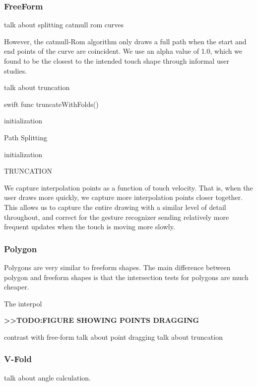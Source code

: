 \subsubsection{FreeForm}\label{freeform}

talk about splitting catmull rom curves

However, the catmull-Rom algorithm only draws a full path when the start
and end points of the curve are coincident. We use an alpha value of
1.0, which we found to be the closest to the intended touch shape
through informal user studies.

talk about truncation

\small
\singlespacing 

\begin{pygmented}{swift}
func truncateWithFolds()
\end{pygmented}

\doublespacing
\normalsize

\begin{algorithm}[H]
 initialization\;
 \caption{Path Splitting}
\end{algorithm}

\begin{algorithm}[H]
 initialization\;
 \caption{TRUNCATION}
\end{algorithm}

We capture interpolation points as a function of touch velocity. That
is, when the user draws more quickly, we capture more interpolation
points closer together. This allows us to capture the entire drawing
with a similar level of detail throughout, and correct for the gesture
recognizer sending relatively more frequent updates when the touch is
moving more slowly.

\subsubsection{Polygon}\label{polygon}

Polygons are very similar to freeform shapes. The main difference
between polygon and freeform shapes is that the intersection tests for
polygons are much cheaper.

The interpol

\textbf{\textgreater{}\textgreater{}TODO:FIGURE SHOWING POINTS DRAGGING}

contrast with free-form talk about point dragging talk about truncation

\subsubsection{V-Fold}\label{v-fold}

talk about angle calculation.
